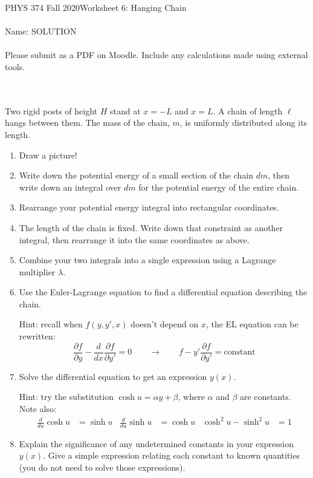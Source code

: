 \documentclass[12pt]{article}
\newcommand{\purple}[1]{{\color{purple} #1}}
\begin{document}
PHYS 374 Fall 2020\hfill Worksheet 6: Hanging Chain\\
\\
Name: \purple{SOLUTION}\\
\\
Please submit as a PDF on Moodle. Include any calculations made using external tools.

\hrulefill
\\
\\
Two rigid posts of height $H$ stand at $x=-L$ and $x=L$. A chain of length $\ell$ hangs between them. The mass of the chain, $m$, is uniformly distributed along its length.
\begin{enumerate}
\item Draw a picture!
\item Write down the potential energy of a small section of the chain $dm$, then write down an integral over $dm$ for the potential energy of the entire chain.
\item Rearrange your potential energy integral into rectangular coordinates. 
\item The length of the chain is fixed. Write down that constraint as another integral, then rearrange it into the same coordinates as above.
\item Combine your two integrals into a single expression using a Lagrange multiplier $\lambda$.
\item Use the Euler-Lagrange equation to find a differential equation describing the chain.

Hint: recall when $f(y, y', x)$ doesn't depend on $x$, the EL equation can be rewritten: 
$$
\frac{\partial f}{\partial y} - \frac{d}{dx} \frac{\partial f}{\partial y'} = 0
\quad\quad\rightarrow\quad\quad
f - y' \frac{\partial f}{\partial y'} = \text{constant}
$$
\item Solve the differential equation to get an expression $y(x)$.

Hint: try the substitution $\cosh u = \alpha y + \beta$, where $\alpha$ and $\beta$ are constants. Note also:
\begin{align*}
    \tfrac{d}{du} \cosh u &= \sinh u&
    \tfrac{d}{du} \sinh u &= \cosh u&
    \cosh^2 u - \sinh^2 u &= 1
\end{align*}
\item Explain the significance of any undetermined constants in your expression $y(x)$. Give a simple expression relating each constant to known quantities (you do not need to solve those expressions). 
\end{enumerate}
\end{document}
